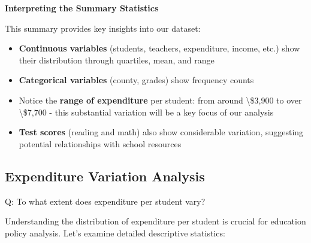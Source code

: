 \documentclass[
  12pt,
  letterpaper,
]{scrbook}
\providecommand{\tightlist}{%
  \setlength{\itemsep}{0pt}\setlength{\parskip}{0pt}}
\renewcommand{\tightlist}{\setlength{\itemsep}{0.5\baselineskip}\setlength{\parskip}{0.2\baselineskip}}
\theoremstyle{definition}
\theoremstyle{plain}
\theoremstyle{remark}
\begin{document}
\textbf{Interpreting the Summary Statistics}

This summary provides key insights into our dataset:

\begin{itemize}
\tightlist
\item
  \textbf{Continuous variables} (students, teachers, expenditure,
  income, etc.) show their distribution through quartiles, mean, and
  range
\item
  \textbf{Categorical variables} (county, grades) show frequency counts
\item
  Notice the \textbf{range of expenditure} per student: from around
  \textbackslash\$3,900 to over \textbackslash\$7,700 - this substantial
  variation will be a key focus of our analysis
\item
  \textbf{Test scores} (reading and math) also show considerable
  variation, suggesting potential relationships with school resources
\end{itemize}

\subsection{Expenditure Variation
Analysis}\label{expenditure-variation-analysis}

Q: To what extent does expenditure per student vary?

Understanding the distribution of expenditure per student is crucial for
education policy analysis. Let's examine detailed descriptive
statistics:
\end{document}
